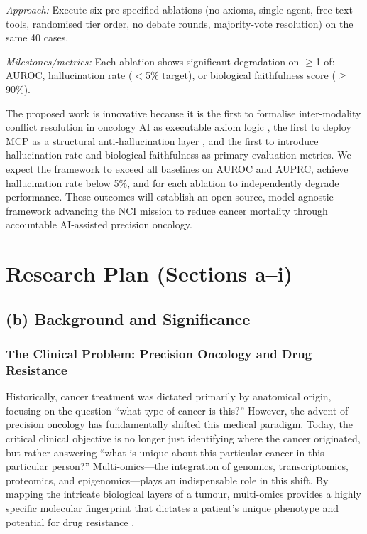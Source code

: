 \documentclass[11pt,letterpaper]{article}
\begin{document}
\textit{Approach:} Execute six pre-specified ablations (no axioms, single agent, free-text tools,
randomised tier order, no debate rounds, majority-vote resolution) on the same 40 cases.

\textit{Milestones/metrics:} Each ablation shows significant degradation on $\geq$1 of: AUROC,
hallucination rate ($<$5\% target), or biological faithfulness score ($\geq$90\%).

The proposed work is innovative because it is the first to formalise inter-modality conflict
resolution in oncology AI as executable axiom logic \cite{ref21}, the first to deploy MCP as a
structural anti-hallucination layer \cite{ref15,ref16}, and the first to introduce hallucination rate
and biological faithfulness as primary evaluation metrics. We expect the framework to exceed
all baselines on AUROC and AUPRC, achieve hallucination rate below 5\%, and for each
ablation to independently degrade performance. These outcomes will establish an open-source,
model-agnostic framework advancing the NCI mission to reduce cancer mortality through
accountable AI-assisted precision oncology.

\newpage

\section{Research Plan (Sections a--i)}

\subsection{(b) Background and Significance}

\subsubsection{The Clinical Problem: Precision Oncology and Drug Resistance}

Historically, cancer treatment was dictated primarily by anatomical origin, focusing on the
question ``what type of cancer is this?'' However, the advent of precision oncology has
fundamentally shifted this medical paradigm. Today, the critical clinical objective is no longer
just identifying where the cancer originated, but rather answering ``what is unique about this
particular cancer in this particular person?'' Multi-omics---the integration of genomics,
transcriptomics, proteomics, and epigenomics---plays an indispensable role in this shift. By
mapping the intricate biological layers of a tumour, multi-omics provides a highly specific
molecular fingerprint that dictates a patient's unique phenotype and potential for drug
resistance \cite{ref1,ref7}.
\end{document}
